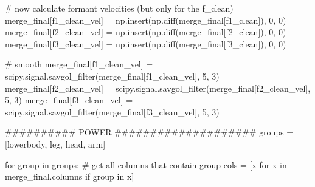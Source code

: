 \documentclass[
  letterpaper,
  DIV=11,
  numbers=noendperiod]{scrreprt}
\newenvironment{Shaded}{\begin{snugshade}}{\end{snugshade}}
\newcommand{\CommentTok}[1]{\textcolor[rgb]{0.37,0.37,0.37}{#1}}
\newcommand{\ControlFlowTok}[1]{\textcolor[rgb]{0.00,0.23,0.31}{#1}}
\newcommand{\DecValTok}[1]{\textcolor[rgb]{0.68,0.00,0.00}{#1}}
\newcommand{\KeywordTok}[1]{\textcolor[rgb]{0.00,0.23,0.31}{#1}}
\newcommand{\NormalTok}[1]{\textcolor[rgb]{0.00,0.23,0.31}{#1}}
\newcommand{\OperatorTok}[1]{\textcolor[rgb]{0.37,0.37,0.37}{#1}}
\newcommand{\StringTok}[1]{\textcolor[rgb]{0.13,0.47,0.30}{#1}}
\begin{document}
\begin{Shaded}
\begin{Highlighting}[]
    \CommentTok{\# now calculate formant velocities (but only for the f\_clean)}
\NormalTok{    merge\_final[}\StringTok{\textquotesingle{}f1\_clean\_vel\textquotesingle{}}\NormalTok{] }\OperatorTok{=}\NormalTok{ np.insert(np.diff(merge\_final[}\StringTok{\textquotesingle{}f1\_clean\textquotesingle{}}\NormalTok{]), }\DecValTok{0}\NormalTok{, }\DecValTok{0}\NormalTok{)}
\NormalTok{    merge\_final[}\StringTok{\textquotesingle{}f2\_clean\_vel\textquotesingle{}}\NormalTok{] }\OperatorTok{=}\NormalTok{ np.insert(np.diff(merge\_final[}\StringTok{\textquotesingle{}f2\_clean\textquotesingle{}}\NormalTok{]), }\DecValTok{0}\NormalTok{, }\DecValTok{0}\NormalTok{)}
\NormalTok{    merge\_final[}\StringTok{\textquotesingle{}f3\_clean\_vel\textquotesingle{}}\NormalTok{] }\OperatorTok{=}\NormalTok{ np.insert(np.diff(merge\_final[}\StringTok{\textquotesingle{}f3\_clean\textquotesingle{}}\NormalTok{]), }\DecValTok{0}\NormalTok{, }\DecValTok{0}\NormalTok{)}

    \CommentTok{\# smooth}
\NormalTok{    merge\_final[}\StringTok{\textquotesingle{}f1\_clean\_vel\textquotesingle{}}\NormalTok{] }\OperatorTok{=}\NormalTok{ scipy.signal.savgol\_filter(merge\_final[}\StringTok{\textquotesingle{}f1\_clean\_vel\textquotesingle{}}\NormalTok{], }\DecValTok{5}\NormalTok{, }\DecValTok{3}\NormalTok{)}
\NormalTok{    merge\_final[}\StringTok{\textquotesingle{}f2\_clean\_vel\textquotesingle{}}\NormalTok{] }\OperatorTok{=}\NormalTok{ scipy.signal.savgol\_filter(merge\_final[}\StringTok{\textquotesingle{}f2\_clean\_vel\textquotesingle{}}\NormalTok{], }\DecValTok{5}\NormalTok{, }\DecValTok{3}\NormalTok{)}
\NormalTok{    merge\_final[}\StringTok{\textquotesingle{}f3\_clean\_vel\textquotesingle{}}\NormalTok{] }\OperatorTok{=}\NormalTok{ scipy.signal.savgol\_filter(merge\_final[}\StringTok{\textquotesingle{}f3\_clean\_vel\textquotesingle{}}\NormalTok{], }\DecValTok{5}\NormalTok{, }\DecValTok{3}\NormalTok{)}

    \CommentTok{\#\#\#\#\#\#\#\#\#\# POWER \#\#\#\#\#\#\#\#\#\#\#\#\#\#\#\#\#\#\#\#}
\NormalTok{    groups }\OperatorTok{=}\NormalTok{ [}\StringTok{\textquotesingle{}lowerbody\textquotesingle{}}\NormalTok{, }\StringTok{\textquotesingle{}leg\textquotesingle{}}\NormalTok{, }\StringTok{\textquotesingle{}head\textquotesingle{}}\NormalTok{, }\StringTok{\textquotesingle{}arm\textquotesingle{}}\NormalTok{]}

    \ControlFlowTok{for}\NormalTok{ group }\KeywordTok{in}\NormalTok{ groups:}
        \CommentTok{\# get all columns that contain group}
\NormalTok{        cols }\OperatorTok{=}\NormalTok{ [x }\ControlFlowTok{for}\NormalTok{ x }\KeywordTok{in}\NormalTok{ merge\_final.columns }\ControlFlowTok{if}\NormalTok{ group }\KeywordTok{in}\NormalTok{ x]}


\end{Highlighting}
\end{Shaded}
\end{document}
